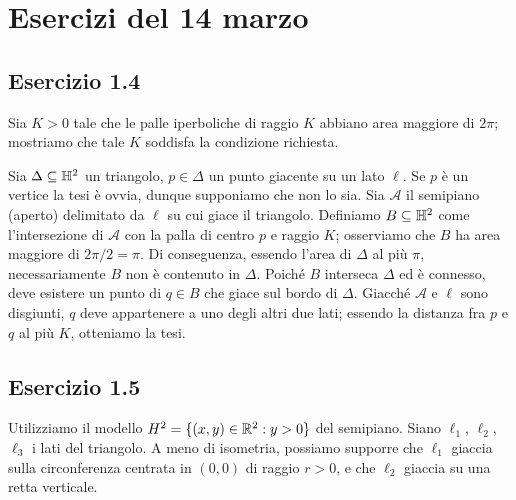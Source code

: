 \section*{Esercizi del 14 marzo}

\subsection*{Esercizio 1.4}
Sia $K>0$ tale che le palle iperboliche di raggio $K$ abbiano area maggiore di $2\pi$; mostriamo che tale $K$ soddisfa la condizione richiesta.

Sia $\Delta\subseteq\mathbb{H}^2$ un triangolo, $p\in\Delta$ un punto giacente su un lato $\ell$. Se $p$ è un vertice la tesi è ovvia, dunque supponiamo che non lo sia. Sia $\mathcal{A}$ il semipiano (aperto) delimitato da $\ell$ su cui giace il triangolo. Definiamo $B\subseteq\mathbb{H}^2$ come l'intersezione di $\mathcal{A}$ con la palla di centro $p$ e raggio $K$; osserviamo che $B$ ha area maggiore di $2\pi/2=\pi$. Di conseguenza, essendo l'area di $\Delta$ al più $\pi$, necessariamente $B$ non è contenuto in $\Delta$. Poiché $B$ interseca $\Delta$ ed è connesso, deve esistere un punto di $q\in B$ che giace sul bordo di $\Delta$. Giacché $\mathcal{A}$ e $\ell$ sono disgiunti, $q$ deve appartenere a uno degli altri due lati; essendo la distanza fra $p$ e $q$ al più $K$, otteniamo la tesi.

\subsection*{Esercizio 1.5}
Utilizziamo il modello $H^2=\{(x,y)\in\mathbb{R}^2:y>0\}$ del semipiano.
Siano $\ell_1$, $\ell_2$, $\ell_3$ i lati del triangolo. A meno di isometria, possiamo supporre che $\ell_1$ giaccia sulla circonferenza centrata in $(0,0)$ di raggio $r>0$, e che $\ell_2$ giaccia su una retta verticale.


